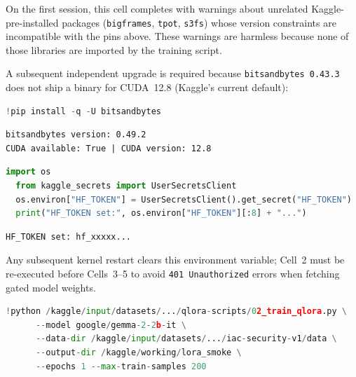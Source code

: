\documentclass[12pt, a4paper]{report}
\begin{document}
On the first session, this cell completes with warnings about unrelated
Kaggle-pre-installed packages (\texttt{bigframes}, \texttt{tpot},
\texttt{s3fs}) whose version constraints are incompatible with the pins
above. These warnings are harmless because none of those libraries are
imported by the training script.

A subsequent independent upgrade is required because \texttt{bitsandbytes
0.43.3} does not ship a binary for CUDA~12.8 (Kaggle's current default):

\begin{lstlisting}[language=Python]
  !pip install -q -U bitsandbytes
\end{lstlisting}

\begin{lstlisting}[style=celloutput,caption={Post-upgrade verification output.}]
bitsandbytes version: 0.49.2
CUDA available: True | CUDA version: 12.8
\end{lstlisting}

\begin{cellbox}
\begin{lstlisting}[language=Python]
  import os
  from kaggle_secrets import UserSecretsClient
  os.environ["HF_TOKEN"] = UserSecretsClient().get_secret("HF_TOKEN")
  print("HF_TOKEN set:", os.environ["HF_TOKEN"][:8] + "...")
\end{lstlisting}
\end{cellbox}

\begin{lstlisting}[style=celloutput]
HF_TOKEN set: hf_xxxxx...
\end{lstlisting}

Any subsequent kernel restart clears this environment variable; Cell~2
must be re-executed before Cells~3--5 to avoid \texttt{401 Unauthorized}
errors when fetching gated model weights.

\begin{cellbox}
\begin{lstlisting}[language=Python]
  !python /kaggle/input/datasets/.../qlora-scripts/02_train_qlora.py \
      --model google/gemma-2-2b-it \
      --data-dir /kaggle/input/datasets/.../iac-security-v1/data \
      --output-dir /kaggle/working/lora_smoke \
      --epochs 1 --max-train-samples 200
\end{lstlisting}
\end{cellbox}
\end{document}

